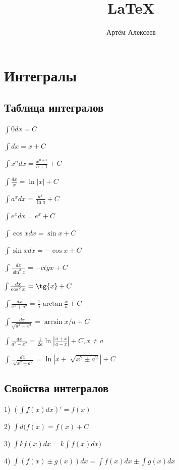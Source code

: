 \documentclass[12pt,a4paper]{article}
\title{\LaTeX}
\date{}
\author{Артём Алексеев}
\begin{document}
\section{Интегралы}
\subsection{Таблица интегралов}

\begin{minipage}{0.4\textwidth}
\begin{flushleft}
$ \int{0dx} = C $ 

$ \int{dx} = x + C $ 

$ \int{x^n dx} = \frac{x^{n+1}}{n+1} + C $ 

$ \int{\frac{dx}{x}} = \ln{|x|} + C $ 

$ \int{a^x dx} = \frac{a^x}{\ln{a}} + C $ 

$ \int{e^x dx} = e^x + C $ 

$ \int{\cos{x}dx} = \sin{x} + C $ 

$ \int{\sin{x}dx} = -\cos{x} + C $
\end{flushleft}
\end{minipage}
\hfill
\begin{minipage}{0.5\textwidth}
\begin{flushleft}
$ \int{\frac{dx}{\sin^2{x}}} = -ctg{x} + C $ 

$ \int{\frac{dx}{\cos^2{x}}} = \tg{x} + C $ 

$ \int{\frac{dx}{x^2+a^2}} = \frac{1}{a} \arctan \frac{x}{a} + C $ 

$ \int{\frac{dx}{\sqrt{a^2-x^2}}} = \arcsin{x/a} + C $ 

$ \int{\frac{dx}{a^2-x^2}}=\frac{1}{2a}\ln{|\frac{a+x}{a-x}|} + C, x \neq a $ 

$ \int{\frac{dx}{\sqrt[]{x^2 \pm a^2}}} = \ln{|x + \sqrt[]{x^2 \pm a^2}|} + C $
\end{flushleft}
\end{minipage}

\subsection{Свойства интегралов}

1) $ (\int{f(x)dx})' = f(x) $ 

2) $ \int{d(f(x)} = f(x) + C $ 

3) $ \int{k f(x)dx} = k \int{f(x)dx)} $ 

4) $ \int{(f(x) \pm g(x))dx} = \int{f(x)dx} \pm \int{g(x)dx}$
\end{document}

